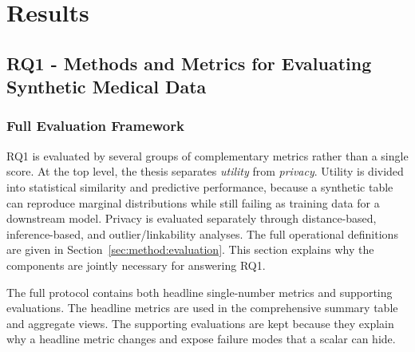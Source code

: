 
\chapter{Results}
\label{ch:results}



\section{RQ1 - Methods and Metrics for Evaluating Synthetic Medical Data}
\label{sec:results:rq1}


\subsection{Full Evaluation Framework}
\label{sec:results:rq1:operationalising}

RQ1 is evaluated by several groups of complementary metrics rather 
than a single score. At the top level, the thesis separates \emph{utility} from
\emph{privacy}. Utility is divided into statistical similarity and
predictive performance, because a synthetic table can reproduce marginal
distributions while still failing as training data for a downstream
model. Privacy is evaluated separately through distance-based, inference-based,
and outlier/linkability analyses. The full operational definitions are given in
Section~\ref{sec:method:evaluation}. This section explains why the
components are jointly necessary for answering RQ1.

The full protocol contains both headline single-number metrics and
supporting evaluations. The headline metrics are used in the comprehensive
summary table and aggregate views. The supporting evaluations
are kept because they explain why a headline metric changes and expose
failure modes that a scalar can hide.

